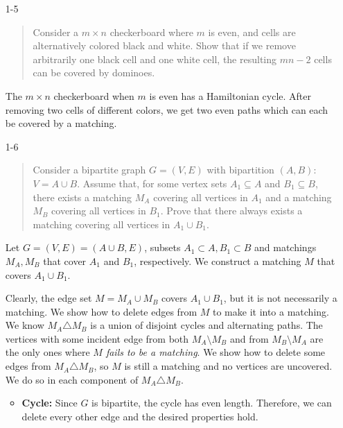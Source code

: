 \documentclass[12pt]{article}
\begin{document}
\begin{enumerate}
\item[1-5]
\begin{quote}
Consider a $m\times n$ checkerboard where $m$ is even, and cells are alternatively colored black and white. Show that if we remove arbitrarily one black cell and one white cell, the resulting $mn-2$ cells can be covered by dominoes. 
\end{quote}


The $m\times n$ checkerboard when $m$ is even has a Hamiltonian cycle. After removing two cells of different colors, we get two even paths which can each be covered by a matching. 

\item[1-6] %
\begin{quote}
Consider a bipartite graph $G=(V,E)$ with bipartition $(A,B)$: $V=A
\cup B$. Assume that, for some vertex sets $A_1\subseteq A$ and $B_1
\subseteq B$, there exists a matching $M_A$ covering all vertices in
$A_1$ and a matching $M_B$ covering all vertices in $B_1$. Prove that
there always exists a matching covering all vertices in $A_1\cup
B_1$. 
\end{quote}

Let $G = (V, E) = (A\cup B, E)$, subsets $A_1 \subset A, B_1 \subset B$ and matchings
$M_A, M_B$ that cover $A_1$ and $B_1$, respectively.
We construct a matching $M$ that covers $A_1 \cup B_1$.
	
Clearly, the edge set $M = M_A \cup M_B$ covers $A_1 \cup B_1$, but it is not necessarily a matching.
We show how to delete edges from $M$ to make it into a matching.
We know $M_A \triangle M_B$ is a union of disjoint cycles and alternating paths.
The vertices with some incident edge from both $M_A\setminus M_B$ and from $M_B\setminus M_A$ are the only ones
where {\em $M$ fails to be a matching}.
We show how to delete some edges from $M_A \triangle M_B$, so $M$ is still a matching
and no vertices are uncovered. We do so in each component of $M_A \triangle M_B$.
	
\begin{itemize}
	
\item \textbf{Cycle:} Since $G$ is bipartite, the cycle has even length.
Therefore, we can delete every other edge and the desired properties hold.
		

\end{itemize}
\end{enumerate}
\end{document}
